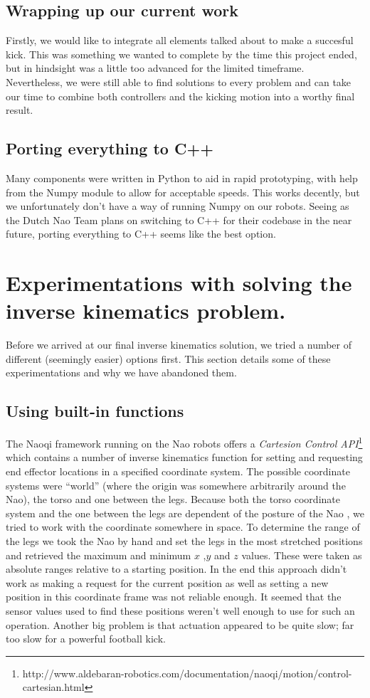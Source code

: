 \documentclass[a4paper]{article}
\begin{document}
\subsection{Wrapping up our current work}
Firstly, we would like to integrate all elements talked about to make a succesful kick. This
was something we wanted to complete by the time this project ended, but in
hindsight was a little too advanced for the limited
timeframe. Nevertheless, we were still  able to find
solutions to every problem and can take our time to combine both controllers
and the kicking motion into a worthy final result.

\subsection{Porting everything to C++}
Many components were written in Python to aid in rapid prototyping, with help
from the Numpy module to allow for acceptable speeds. This works decently, but
we unfortunately don't have a way of running Numpy on our robots. Seeing as the
Dutch Nao Team plans on switching to C++ for their codebase in the near future,
porting everything to C++ seems like the best option.

\appendix
\section{Experimentations with solving the inverse kinematics problem.}
\label{A}
Before we arrived at our final inverse kinematics solution, we tried a number of
different (seemingly easier) options first.  This section details some of these
experimentations and why we have abandoned them.

\subsection{Using built-in functions}
The Naoqi framework running on the Nao robots offers a \emph{Cartesion Control
API}\footnote{http://www.aldebaran-robotics.com/documentation/naoqi/motion/control-cartesian.html}
which contains a number of inverse kinematics function for setting and
requesting end effector locations in a specified coordinate system.  The
possible coordinate systems were ``world'' (where the origin was somewhere
arbitrarily around the Nao), the torso and one between the legs. Because both
the torso coordinate system and the one between the legs are dependent of the
posture of the Nao , we tried to work with the coordinate somewhere in space.
To determine the range of the legs we took the Nao by hand and set the legs in
the most stretched positions and retrieved the maximum
and minimum $x$ ,$y$ and $z$ values.  These were taken as absolute ranges
relative to a starting position. In the end this approach
didn't work as making a request for the current position as well as setting a
new position in this coordinate frame was not reliable enough. It seemed that
the sensor values used to find these positions weren't well enough to use for
such an operation. Another big problem is that actuation appeared to be quite
slow; far too slow for a powerful football kick.
\end{document}
